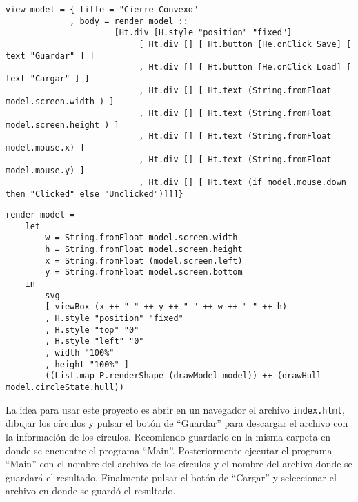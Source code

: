 \documentclass[12pt]{article}
\begin{document}
\begin{itemize}
  \begin{verbatim}
view model = { title = "Cierre Convexo"
             , body = render model ::
                      [Ht.div [H.style "position" "fixed"]
                           [ Ht.div [] [ Ht.button [He.onClick Save] [ text "Guardar" ] ]
                           , Ht.div [] [ Ht.button [He.onClick Load] [ text "Cargar" ] ]
                           , Ht.div [] [ Ht.text (String.fromFloat model.screen.width ) ]
                           , Ht.div [] [ Ht.text (String.fromFloat model.screen.height ) ]
                           , Ht.div [] [ Ht.text (String.fromFloat model.mouse.x) ]
                           , Ht.div [] [ Ht.text (String.fromFloat model.mouse.y) ]
                           , Ht.div [] [ Ht.text (if model.mouse.down then "Clicked" else "Unclicked")]]]}
  \end{verbatim}

  \begin{verbatim}
render model =
    let
        w = String.fromFloat model.screen.width
        h = String.fromFloat model.screen.height
        x = String.fromFloat (model.screen.left)
        y = String.fromFloat model.screen.bottom
    in
        svg
        [ viewBox (x ++ " " ++ y ++ " " ++ w ++ " " ++ h)
        , H.style "position" "fixed"
        , H.style "top" "0"
        , H.style "left" "0"
        , width "100%"
        , height "100%" ]
        ((List.map P.renderShape (drawModel model)) ++ (drawHull model.circleState.hull))
  \end{verbatim}
  
\end{itemize}

La idea para usar este proyecto es abrir en un navegador el archivo \texttt{index.html}, dibujar los círculos y pulsar el botón de ``Guardar'' para descargar el archivo con la información de los círculos. Recomiendo guardarlo en la misma carpeta en donde se encuentre el programa ``Main''. Posteriormente ejecutar el programa ``Main'' con el nombre del archivo de los círculos y el nombre del archivo donde se guardará el resultado. Finalmente pulsar el botón de ``Cargar'' y seleccionar el archivo en donde se guardó el resultado.
\end{document}
